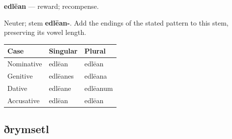 \par\begin{minipage}{\linewidth}\raggedright
\textbf{edlēan} — reward; recompense.

Neuter; stem \textbf{edlēan-}. Add the endings of the stated pattern to this stem, preserving its vowel length.

\par\begingroup
\fontsize{10.5}{13.2}\selectfont
\setlength{\LTleft}{0pt}\setlength{\LTright}{\fill}
\noindent
\begin{tabular}{@{}>{\raggedright\arraybackslash}p{39.46mm}>{\raggedright\arraybackslash}p{39.46mm}>{\raggedright\arraybackslash}p{39.46mm}@{}}
\toprule
\textbf{Case} & \textbf{Singular} & \textbf{Plural} \\
\midrule
Nominative & edlēan & edlēan \\
Genitive & edlēanes & edlēana \\
Dative & edlēane & edlēanum \\
Accusative & edlēan & edlēan \\
\bottomrule
\end{tabular}
\par\endgroup

\end{minipage}\par
{}
\subsection*{ðrymsetl}

